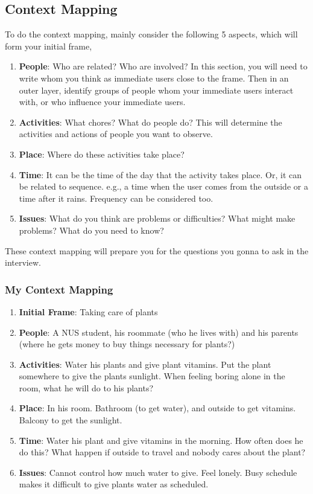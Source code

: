 \documentclass[math,code]{amznotes}
\theoremstyle{remark}
\begin{document}
\subsection{Context Mapping}
To do the context mapping, mainly consider the following 5 aspects, which will form your initial frame,
\begin{enumerate}
    \item \textbf{People}: Who are related? Who are involved? In this section, you will need to write whom you think as immediate users close to the frame. Then in an outer layer, identify groups of people whom your immediate users interact with, or who influence your immediate users.
    \item \textbf{Activities}: What chores? What do people do? This will determine the activities and actions of people you want to observe.
    \item \textbf{Place}: Where do these activities take place?
    \item \textbf{Time}: It can be the time of the day that the activity takes place. Or, it can be related to sequence. e.g., a time when the user comes from the outside or a time after it rains. Frequency can be considered too.
    \item \textbf{Issues}: What do you think are problems or difficulties? What might make problems? What do you need to know?
\end{enumerate}
These context mapping will prepare you for the questions you gonna to ask in the interview.

\subsubsection{My Context Mapping}
\begin{enumerate}
    \item \textbf{Initial Frame}: Taking care of plants
    \item \textbf{People}: A NUS student, his roommate (who he lives with) and his parents (where he gets money to buy things necessary for plants?)
    \item \textbf{Activities}: Water his plants and give plant vitamins. Put the plant somewhere to give the plants sunlight. When feeling boring alone in the room, what he will do to his plants? 
    \item \textbf{Place}: In his room. Bathroom (to get water), and outside to get vitamins. Balcony to get the sunlight.
    \item \textbf{Time}: Water his plant and give vitamins in the morning. How often does he do this? What happen if outside to travel and nobody cares about the plant?
    \item \textbf{Issues}: Cannot control how much water to give. Feel lonely. Busy schedule makes it difficult to give plants water as scheduled.
\end{enumerate}
\end{document}
